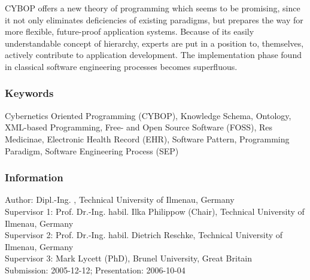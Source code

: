 CYBOP offers a new theory of programming which seems to be promising, since it
not only eliminates deficiencies of existing paradigms, but prepares the way
for more flexible, future-proof application systems. Because of its easily
understandable concept of hierarchy, experts are put in a position to,
themselves, actively contribute to application development. The implementation
phase found in classical software engineering processes becomes superfluous.

\subsubsection{Keywords}

Cybernetics Oriented Programming (CYBOP),
Knowledge Schema,
Ontology,
XML-based Programming,
Free- and Open Source Software (FOSS),
Res Medicinae,
Electronic Health Record (EHR),
Software Pattern,
Programming Paradigm,
Software Engineering Process (SEP)

\subsubsection{Information}

Author: Dipl.-Ing. \authormacro, Technical University of Ilmenau, Germany\\
Supervisor 1: Prof. Dr.-Ing. habil. Ilka Philippow (Chair), Technical University of Ilmenau, Germany\\
Supervisor 2: Prof. Dr.-Ing. habil. Dietrich Reschke, Technical University of Ilmenau, Germany\\
Supervisor 3: Mark Lycett (PhD), Brunel University, Great Britain\\
Submission: 2005-12-12; Presentation: 2006-10-04

